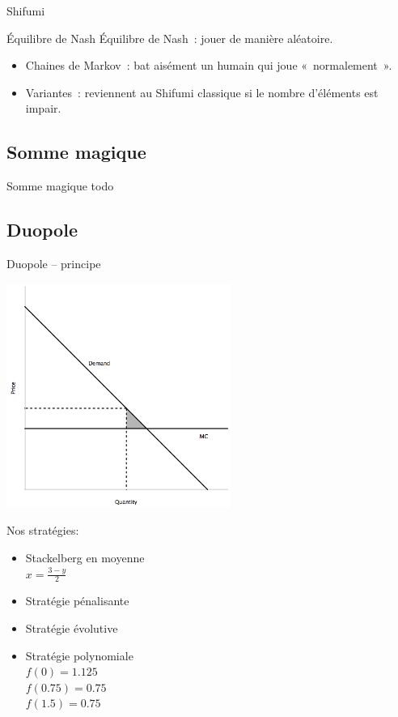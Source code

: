 \documentclass{beamer}
\begin{document}
\begin{frame}{Shifumi}
    \begin{block}{Équilibre de Nash}
        Équilibre de Nash~: jouer de manière aléatoire.
    \end{block}

    \begin{itemize}
        \item Chaines de Markov~: bat aisément un humain qui joue «~normalement~».
        \item Variantes~: reviennent au Shifumi classique si le nombre d'éléments est impair.
    \end{itemize}
\end{frame}

\subsection{Somme magique}
\begin{frame}{Somme magique}
  todo
\end{frame}

\subsection{Duopole}
\begin{frame}{Duopole -- principe}
  \begin{vwcol}[widths={0.6,0.4}, sep=.0cm, rule=0pt]
    \includegraphics[width=0.55\textwidth]{jeux/duopole_principe}

    Nos stratégies:
    \begin{itemize}
      \item Stackelberg en moyenne \\
      $x=\frac{3-y}{2}$
      \item Stratégie pénalisante
      \item Stratégie évolutive
      \item Stratégie polynomiale \\
      $f(0) = 1.125$ \\
      $f(0.75) = 0.75$ \\
      $f(1.5) = 0.75$ \\
    \end{itemize}
  \end{vwcol}
\end{frame}
\end{document}
